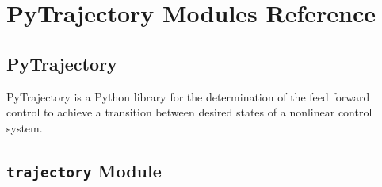 \documentclass[letterpaper,10pt,english]{sphinxmanual}
\begin{document}
\chapter{PyTrajectory Modules Reference}
\label{pytrajectory:pytrajectory-modules-reference}\label{pytrajectory:module-pytrajectory}\label{pytrajectory:pytrajectory}\label{pytrajectory::doc}

\section{PyTrajectory}
\label{pytrajectory:id1}
PyTrajectory is a Python library for the determination of the feed forward control
to achieve a transition between desired states of a nonlinear control system.


\section{\texttt{trajectory} Module}
\label{pytrajectory:module-pytrajectory.trajectory}\label{pytrajectory:trajectory-module}
\end{document}
